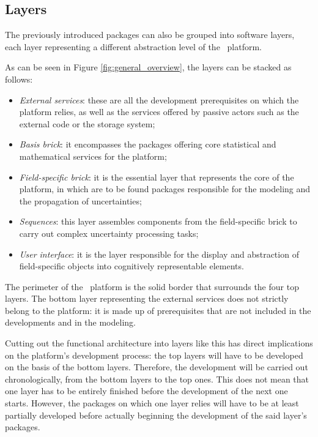 \subsection{Layers}

The previously introduced packages can also be grouped into software layers, each layer representing a different abstraction level of the \OT\ platform.

As can be seen in Figure \ref{fig:general_overview}, the layers can be stacked as follows:
\begin{itemize}
\item \emph{External services}: these are all the development prerequisites on which the platform relies, as well as the services offered by passive actors such as the external code or the storage system;
\item \emph{Basis brick}: it encompasses the packages offering core statistical and mathematical services for the platform;
\item \emph{Field-specific brick}: it is the essential layer that represents the core of the platform, in which are to be found packages responsible for the modeling and the propagation of uncertainties;
\item \emph{Sequences}: this layer assembles components from the field-specific brick to carry out complex uncertainty processing tasks;
\item \emph{User interface}: it is the layer responsible for the display and abstraction of field-specific objects into cognitively representable elements.
\end{itemize}

The perimeter of the \OT\ platform is the solid border that surrounds the four top layers. The bottom layer representing the external services does not strictly belong to the platform: it is made up of prerequisites that are not included in the developments and in the modeling.

Cutting out the functional architecture into layers like this has direct implications on the platform's development process: the top layers will have to be developed on the basis of the bottom layers. Therefore, the development will be carried out chronologically, from the bottom layers to the top ones. This does not mean that one layer has to be entirely finished before the development of the next one starts. However, the packages on which one layer relies will have to be at least partially developed before actually beginning the development of the said layer's packages.

